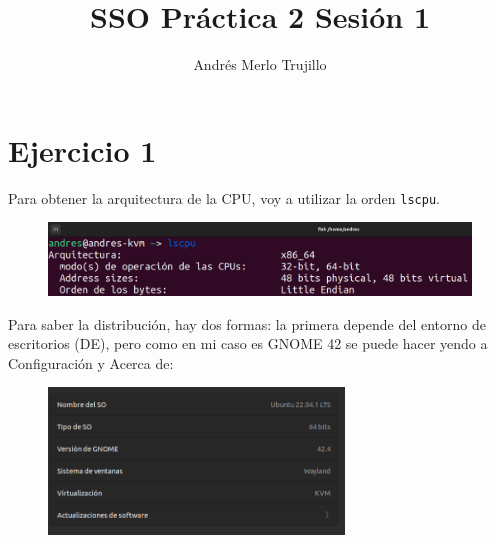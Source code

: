\documentclass{article}
\title{SSO Práctica 2 Sesión 1}
\author{Andrés Merlo Trujillo}
\date{}
\begin{document}
\maketitle

\tableofcontents

\newpage

\section*{Ejercicio 1}

Para obtener la arquitectura de la CPU, voy a utilizar la orden \verb|lscpu|.

\begin{figure}[H]
    \includegraphics[width=\textwidth]{imagenes/Captura desde 2022-11-23 10-33-11.png}
\end{figure}

\bigskip

Para saber la distribución, hay dos formas: la primera depende del entorno de escritorios (DE), pero como en mi caso es GNOME 42 se puede hacer yendo a Configuración y Acerca de:

\begin{figure}[H]
    \centering
    \includegraphics[width=0.7\textwidth]{imagenes/Captura desde 2022-11-23 10-37-46.png}
\end{figure}
\end{document}
